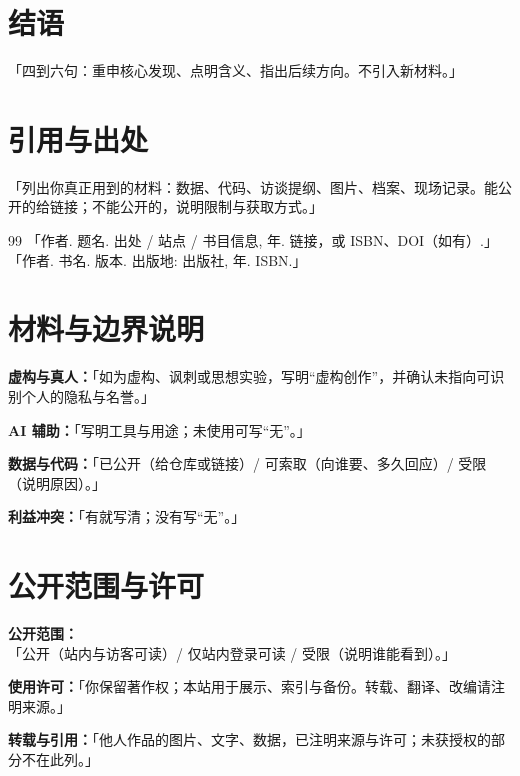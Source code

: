 \documentclass[12pt,a4paper]{article}
\begin{document}
\section{结语}
「四到六句：重申核心发现、点明含义、指出后续方向。不引入新材料。」

\section*{引用与出处}
「列出你真正用到的材料：数据、代码、访谈提纲、图片、档案、现场记录。能公开的给链接；不能公开的，说明限制与获取方式。」

\begin{thebibliography}{99}
 「作者. 题名. 出处 / 站点 / 书目信息, 年. 链接，或 ISBN、DOI（如有）.」
 「作者. 书名. 版本. 出版地: 出版社, 年. ISBN.」
\end{thebibliography}

\section*{材料与边界说明}
\textbf{虚构与真人：}「如为虚构、讽刺或思想实验，写明“虚构创作”，并确认未指向可识别个人的隐私与名誉。」

\textbf{AI 辅助：}「写明工具与用途；未使用可写“无”。」

\textbf{数据与代码：}「已公开（给仓库或链接）/ 可索取（向谁要、多久回应）/ 受限（说明原因）。」

\textbf{利益冲突：}「有就写清；没有写“无”。」

\section*{公开范围与许可}
\textbf{公开范围：}「公开（站内与访客可读）/ 仅站内登录可读 / 受限（说明谁能看到）。」

\textbf{使用许可：}「你保留著作权；本站用于展示、索引与备份。转载、翻译、改编请注明来源。」

\textbf{转载与引用：}「他人作品的图片、文字、数据，已注明来源与许可；未获授权的部分不在此列。」
\end{document}
